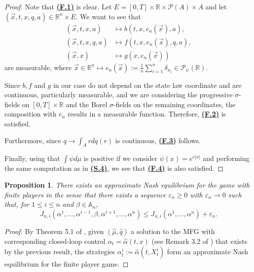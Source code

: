 \documentclass[11pt]{article}
\newtheorem{prop}[thm]{Proposition}
\theoremstyle{definition}
\begin{document}
\begin{proof}
    Note that \textbf{\hyperref[sup: F.1]{(F.1)}} is clear. Let \( E = [0,T] \times \mathbb{R} \times \mathcal{P}(A) \times A \) and let \( (\vec{x},t,x,q,a) \in \mathbb{R}^n \times E \). We want to see that
    \begin{align*}
        (\vec{x},t,x,a) &\mapsto b(t,x,e_n(\vec{x}),a), \\
        (\vec{x},t,x,q,a) &\mapsto f(t,x,e_n(\vec{x}),q,a), \\
        (\vec{x},x) &\mapsto g(x, e_n(\vec{x}))
    \end{align*}
    are measurable, where
    \( \vec{x} \in \mathbb{R}^n \mapsto e_n(\vec{x}) := \displaystyle\frac{1}{n} \sum_{i=1}^n \delta_{x_i} \in \mathcal{P}_{\psi}(\mathbb{R}) \).

    Since \( b,f \) and \( g \) in our case do not depend on the state law coordinate and are continuous, particularly measurable, and we are considering the progressive \(\sigma\)-fields on \( [0,T] \times \mathbb{R} \) and the Borel \(\sigma\)-fields on the remaining coordinates, the composition with \( e_n \) results in a measurable function. %
    Therefore, \textbf{\hyperref[sup: F.2]{(F.2)}} is satisfied.
    
    Furthermore, since \( q \to \int_A r dq(r) \) is continuous, \textbf{\hyperref[sup: F.3]{(F.3)}} follows.
    
    Finally, using that \( \int \psi d\mu \) is positive if we consider \( \psi(x) = e^{c|x|} \) and performing the same computation as in \textbf{\hyperref[sup: S.4]{(S.4)}}, we see that \textbf{\hyperref[sup: F.4]{(F.4)}} is also satisfied.
\end{proof}

\begin{prop}
There exists an approximate Nash equilibrium for the game with finite players in the sense that there exists a sequence \( \varepsilon_n \geq 0 \)
with \( \varepsilon_n \to 0 \) such that, for \( 1 \leq i \leq n \) and \( \beta \in \mathbb{A}_n \),
$$ J_{n,i}(\alpha^1,...,\alpha^{i-1},\beta,\alpha^{i+1},...,\alpha^n) \leq J_{n,i}(\alpha^1,...,\alpha^n) + \varepsilon_n. $$
\end{prop}

\begin{proof}
    By Theorem 5.1 of \citep{carmona2015weakmfgformulation}, given \( (\hat{\mu},\hat{q}) \) a solution to the MFG with corresponding closed-loop control $\alpha_t=\hat{\alpha}(t,x)$ (see Remark 3.2 of \citep{carmona2015weakmfgformulation}) that exists by the previous result, the strategies \( \alpha_t^i := \hat{\alpha}(t,X^i_t) \) form an approximate Nash equilibrium for the finite player game.
\end{proof}
\end{document}
